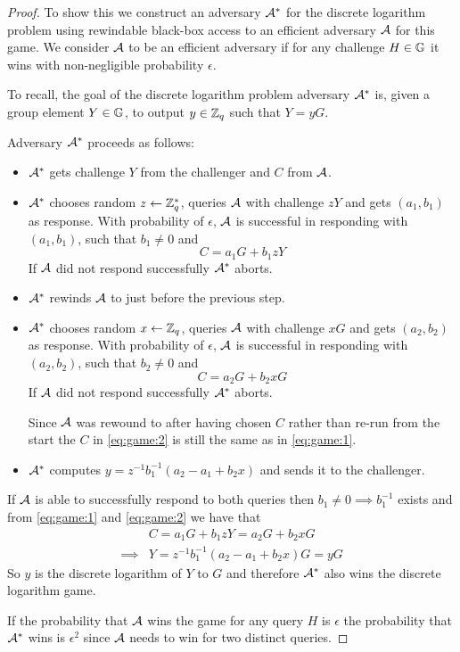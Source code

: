 \begin{proof}
	To show this we construct an adversary $\mathcal A^*$ for the discrete logarithm problem using rewindable black-box access to an efficient adversary $\mathcal A$ for this game.
	We consider $\mathcal A$ to be an efficient adversary if for any challenge $H \in \mathbb G$ it wins with non-negligible probability $\epsilon$.

	To recall, the goal of the discrete logarithm problem adversary $\mathcal A^*$ is, given a group element $Y \in \mathbb G$, to output $y \in \mathbb Z_q$ such that $Y = yG$.

	Adversary $\mathcal A^*$ proceeds as follows:
	\begin{itemize}
		\item $\mathcal A^*$ gets challenge $Y$ from the challenger and $C$ from $\mathcal A$.
		\item $\mathcal A^*$ chooses random $z \leftarrow \mathbb Z^*_q$, queries $\mathcal A$ with challenge $zY$ and gets $(a_1, b_1)$ as response.
		With probability of $\epsilon$, $\mathcal A$ is successful in responding with $(a_1, b_1)$, such that $b_1 \ne 0$ and
		\begin{equation}\label{eq:game:1}
			C = a_1 G + b_1 zY
		\end{equation}
		If $\mathcal A$ did not respond successfully $\mathcal A^*$ aborts.
		\item $\mathcal A^*$ rewinds $\mathcal A$ to just before the previous step.
		\item $\mathcal A^*$ chooses random $x \leftarrow \mathbb Z_q$, queries $\mathcal A$ with challenge $xG$ and gets $(a_2, b_2)$ as response.
		With probability of $\epsilon$, $\mathcal A$ is successful in responding with $(a_2, b_2)$, such that $b_2 \ne 0$ and
		\begin{equation}\label{eq:game:2}
			C = a_2 G + b_2 xG
		\end{equation}
		If $\mathcal A$ did not respond successfully $\mathcal A^*$ aborts.

		\NB Since $\mathcal A$ was rewound to after having chosen $C$ rather than re-run from the start the $C$ in \cref{eq:game:2} is still the same as in \cref{eq:game:1}.
		\item $\mathcal A^*$ computes $y = z^{-1} b_1^{-1}(a_2 - a_1 + b_2 x)$ and sends it to the challenger.
	\end{itemize}

	If $\mathcal A$ is able to successfully respond to both queries then $b_1 \ne 0 \implies b_1^{-1}$ exists and from \cref{eq:game:1} and \cref{eq:game:2} we have that
	$$\begin{aligned}
		         & C = a_1 G + b_1 zY = a_2 G + b_2 xG \\
		\implies & Y = z^{-1} b_1^{-1}(a_2 - a_1 + b_2 x) G = yG
	\end{aligned}$$
	So $y$ is the discrete logarithm of $Y$ to $G$ and therefore $\mathcal A^*$ also wins the discrete logarithm game.

	If the probability that $\mathcal A$ wins the game for any query $H$ is $\epsilon$ the probability that $\mathcal A^*$ wins is $\epsilon^2$ since $\mathcal A$ needs to win for two distinct queries.
\end{proof}

